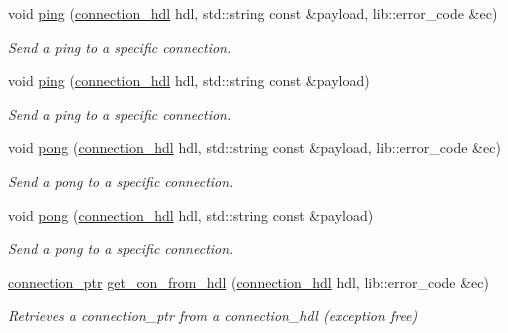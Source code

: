 \begin{DoxyCompactItemize}
\item 
void \mbox{\hyperlink{classwebsocketpp_1_1endpoint_a1d4bcbc3fcd87f48120fbb421467f414}{ping}} (\mbox{\hyperlink{namespacewebsocketpp_a6b3d26a10ee7229b84b776786332631d}{connection\+\_\+hdl}} hdl, std\+::string const \&payload, lib\+::error\+\_\+code \&ec)
\begin{DoxyCompactList}\small\item\em Send a ping to a specific connection. \end{DoxyCompactList}\item 
void \mbox{\hyperlink{classwebsocketpp_1_1endpoint_a35267939caf4b611b01701ba13cd0b33}{ping}} (\mbox{\hyperlink{namespacewebsocketpp_a6b3d26a10ee7229b84b776786332631d}{connection\+\_\+hdl}} hdl, std\+::string const \&payload)
\begin{DoxyCompactList}\small\item\em Send a ping to a specific connection. \end{DoxyCompactList}\item 
void \mbox{\hyperlink{classwebsocketpp_1_1endpoint_a58a55e0288d4da518b2a806587df3809}{pong}} (\mbox{\hyperlink{namespacewebsocketpp_a6b3d26a10ee7229b84b776786332631d}{connection\+\_\+hdl}} hdl, std\+::string const \&payload, lib\+::error\+\_\+code \&ec)
\begin{DoxyCompactList}\small\item\em Send a pong to a specific connection. \end{DoxyCompactList}\item 
void \mbox{\hyperlink{classwebsocketpp_1_1endpoint_ab546cb4089f868a09c8d0694fb6f0be6}{pong}} (\mbox{\hyperlink{namespacewebsocketpp_a6b3d26a10ee7229b84b776786332631d}{connection\+\_\+hdl}} hdl, std\+::string const \&payload)
\begin{DoxyCompactList}\small\item\em Send a pong to a specific connection. \end{DoxyCompactList}\item 
\mbox{\hyperlink{classwebsocketpp_1_1endpoint_aa90d289d870c500be228ee1dea75b8b2}{connection\+\_\+ptr}} \mbox{\hyperlink{classwebsocketpp_1_1endpoint_a0fe4457427d4124abe7ca022ba7afbb4}{get\+\_\+con\+\_\+from\+\_\+hdl}} (\mbox{\hyperlink{namespacewebsocketpp_a6b3d26a10ee7229b84b776786332631d}{connection\+\_\+hdl}} hdl, lib\+::error\+\_\+code \&ec)
\begin{DoxyCompactList}\small\item\em Retrieves a connection\+\_\+ptr from a connection\+\_\+hdl (exception free) \end{DoxyCompactList}\item 

\end{DoxyCompactItemize}

